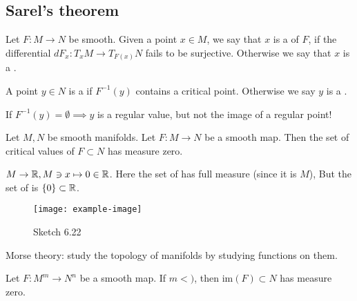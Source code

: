 \subsection{Sarel's theorem}

\begin{definition*}
    Let \(F:M\to N\) be smooth. Given a point \(x\in M\), we say that \(x\) is a  
    of \(F\), if the differential  \(dF_x:T_xM\to T_{F(x)}N\) fails to be surjective. Otherwise 
    we say that \(x\) is a .
    
    A point \(y\in N\) is a  if \(F^{-1}(y)\) contains a 
    critical point. Otherwise we say \(y\) is a . 
\end{definition*}

\begin{remark}
    If \(F^{-1}(y)=\emptyset\implies y\) is a regular value, but not the image of a regular point!
\end{remark}

\begin{theorem}[Sarel]\label{thm:6.9:sarel}
    Let \(M,N\) be smooth manifolds. Let \(F:M\to N\) be a smooth map. Then 
    the set of critical values of \(F\subset N\) has measure zero. 
\end{theorem}

\begin{example}
    \(M\to\mathbb{R}, M\ni x\mapsto 0\in\mathbb{R}\). Here the set of  has full measure (since it is \(M\)),
    But the set of  is \(\{0\}\subset\mathbb{R}\).
\end{example}

\begin{example}
    \begin{figure}[H]\label{fig:6.22} %
        \centering
        \texttt{[image: example-image]}
        \caption{Sketch 6.22}
    \end{figure}
    Morse theory: study  the topology of manifolds by studying functions on them.
\end{example}

\begin{corollary}\label{cor:6.10}
    Let \(F:M^m\to N^n\) be a smooth map. If \(m<)\), then 
    \(\text{im}(F)\subset N\) has measure zero. 
\end{corollary}

